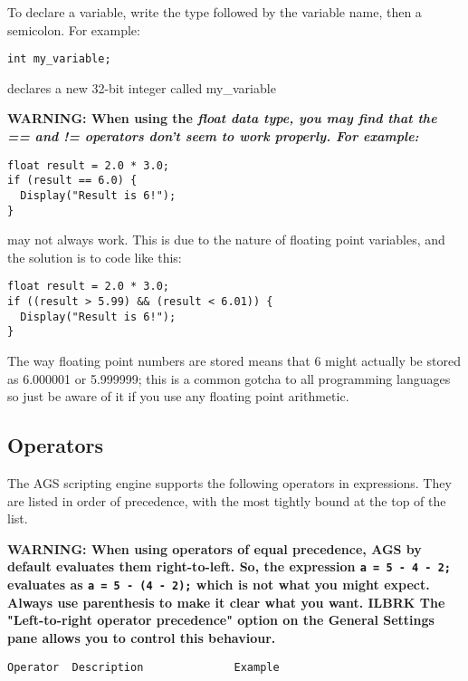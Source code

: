 To declare a variable, write the type followed by the variable name, then a semicolon.
For example:

\verb$int my_variable;$

declares a new 32-bit integer called  my_variable

\bf{WARNING:} When using the \it{float} data type, you may find that the == and != operators
don't seem to work properly. For example:
\begin{verbatim}
float result = 2.0 * 3.0;
if (result == 6.0) {
  Display("Result is 6!");
}
\end{verbatim}
may not always work. This is due to the nature of floating point variables, and the solution
is to code like this:
\begin{verbatim}
float result = 2.0 * 3.0;
if ((result > 5.99) && (result < 6.01)) {
  Display("Result is 6!");
}
\end{verbatim}
The way floating point numbers are stored means that 6 might actually be stored as 6.000001
or 5.999999; this is a common gotcha to all programming languages so just be aware of it
if you use any floating point arithmetic.


\subsection{Operators}%

The AGS scripting engine supports the following operators in expressions. They are listed
in order of precedence, with the most tightly bound at the top of the list.

\bf{WARNING:} When using operators of equal precedence, AGS by default evaluates them
right-to-left. So, the expression \verb$a = 5 - 4 - 2;$ evaluates as \verb$a = 5 - (4 - 2);$
which is not what you might expect. Always use parenthesis to make it clear what you want. ILBRK
The "Left-to-right operator precedence" option on the General Settings pane allows you to
control this behaviour.

\bf{\begin{verbatim}
Operator  Description              Example
\end{verbatim} }

